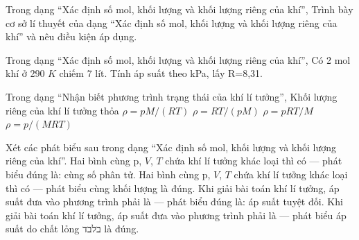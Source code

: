 \begin{ex}
Trong dạng “Xác định số mol, khối lượng và khối lượng riêng của khí”, Trình bày cơ sở lí thuyết của dạng “Xác định số mol, khối lượng và khối lượng riêng của khí” và nêu điều kiện áp dụng.
\choiceTF

\end{ex}

\begin{ex}
Trong dạng “Xác định số mol, khối lượng và khối lượng riêng của khí”, Có 2 mol khí ở 290 $K$ chiếm 7 lít. Tính áp suất theo kPa, lấy R=8,31.
\end{ex}

\begin{ex}
Trong dạng “Nhận biết phương trình trạng thái của khí lí tưởng”, Khối lượng riêng của khí lí tưởng thỏa
\choice
{\True $\rho=pM/(RT)$}
{$\rho=RT/(pM)$}
{$\rho=pRT/M$}
{$\rho=p/(MRT)$}
\end{ex}

\begin{ex}
Xét các phát biểu sau trong dạng “Xác định số mol, khối lượng và khối lượng riêng của khí”.
\choiceTF
{\True Hai bình cùng p, $V$, $T$ chứa khí lí tưởng khác loại thì có — phát biểu đúng là: cùng số phân tử.}
{Hai bình cùng p, $V$, $T$ chứa khí lí tưởng khác loại thì có — phát biểu cùng khối lượng là đúng.}
{\True Khi giải bài toán khí lí tưởng, áp suất đưa vào phương trình phải là — phát biểu đúng là: áp suất tuyệt đối.}
{Khi giải bài toán khí lí tưởng, áp suất đưa vào phương trình phải là — phát biểu áp suất do chất lỏng בלבד là đúng.}
\end{ex}

